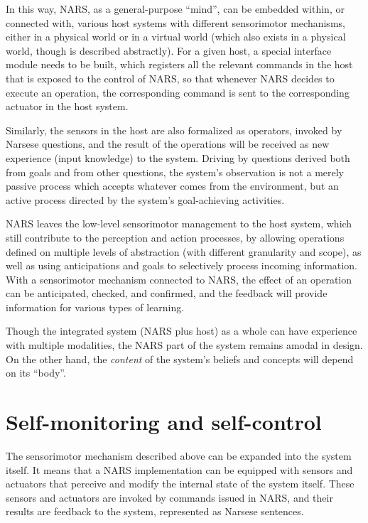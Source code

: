 In this way, NARS, as a general-purpose ``mind'', can be embedded within, or connected with, various host systems with different sensorimotor mechanisms, either in a physical world or in a virtual world (which also exists in a physical world, though is described abstractly). For a given host, a special interface module needs to be built, which registers all the relevant commands in the host that is exposed to the control of NARS, so that whenever NARS decides to execute an operation, the corresponding command is sent to the corresponding actuator in the host system.

Similarly, the sensors in the host are also formalized as operators, invoked by Narsese questions, and the result of the operations will be received as new experience (input knowledge) to the system. Driving by questions derived both from goals and from other questions, the system's observation is not a merely passive process which accepts whatever comes from the environment, but an active process directed by the system's goal-achieving activities.

NARS leaves the low-level sensorimotor management to the host system, which still contribute to the perception and action processes, by allowing operations defined on multiple levels of abstraction (with different granularity and scope), as well as using anticipations and goals to selectively process incoming information. With a sensorimotor mechanism connected to NARS, the effect of an operation can be anticipated, checked, and confirmed, and the feedback will provide information for various types of learning. 

Though the integrated system (NARS plus host) as a whole can have experience with multiple modalities, the NARS part of the system remains amodal in design. On the other hand, the \emph{content} of the system's beliefs and concepts will depend on its ``body''. 

\section{Self-monitoring and self-control}

The sensorimotor mechanism described above can be expanded into the system itself. It means that a NARS implementation can be equipped with sensors and actuators that perceive and modify the internal state of the system itself. These sensors and actuators are invoked by commands issued in NARS, and their results are feedback to the system, represented as Narsese sentences.

